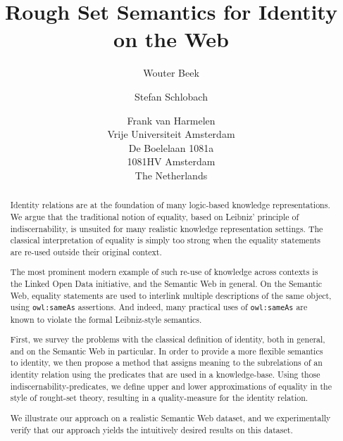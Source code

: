 \documentclass[letterpaper]{article}
\author{
  Wouter Beek \and Stefan Schlobach \and Frank van Harmelen\\
  Vrije Universiteit Amsterdam\\
  De Boelelaan 1081a\\
  1081HV Amsterdam\\
  The Netherlands
}
\title{Rough Set Semantics for Identity on the Web}
\newcommand{\URL}[1]{{\small \url{#1}}}
\begin{document}
\maketitle
\begin{abstract}
Identity relations are at the foundation of many
  logic-based knowledge representations.
We argue that the traditional notion of equality,
  based on Leibniz' principle of indiscernability,
  is unsuited for many realistic knowledge representation settings.
The classical  interpretation of equality is simply too strong
  when the equality statements are re-used outside their original context.

The most prominent modern example of such re-use of knowledge across contexts
  is the Linked Open Data initiative, and the Semantic Web in general.
On the Semantic Web, equality statements are used to interlink
  multiple descriptions of the same object,
  using {\small \texttt{owl:sameAs}} assertions.
And indeed, many practical uses of {\small \texttt{owl:sameAs}}
  are known to violate the formal Leibniz-style semantics.

First, we survey the problems with the classical definition of identity,
  both in general, and on the Semantic Web in particular. 
In order to provide a more flexible semantics to identity,
  we then propose a method that assigns meaning to the subrelations of
  an identity relation using the predicates that are used in a knowledge-base.
Using those indiscernability-predicates,
  we define upper and lower approximations of equality in the style of
  rought-set theory, resulting in a quality-measure for
  the identity relation.

We illustrate our approach on a realistic Semantic Web dataset,
  and we experimentally verify that our approach yields
  the intuitively desired results on this dataset.




\end{abstract}













%



\end{document}
